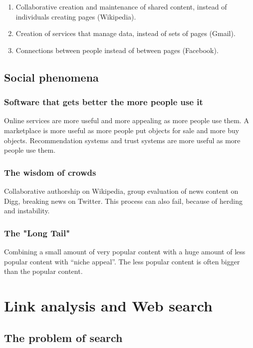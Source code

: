 \begin{enumerate}
\item Collaborative creation and maintenance of shared content, instead of individuals creating pages (Wikipedia).
\item Creation of services that manage data, instead of sets of pages (Gmail).
\item Connections between people instead of between pages (Facebook).
\end{enumerate}

\subsection{Social phenomena}

\subsubsection{Software that gets better the more people use it}

Online services are more useful and more appealing as more people use them. A marketplace is more useful as more people put objects for sale and more buy objects. Recommendation systems and trust systems are more useful as more people use them.

\subsubsection{The wisdom of crowds}

Collaborative authorship on Wikipedia, group evaluation of news content on Digg, breaking news on Twitter. This process can also fail, because of herding and instability.

\subsubsection{The "Long Tail"}

Combining a small amount of very popular content with a huge amount of less popular content with “niche appeal”. The less popular content is often bigger than the popular content.

\section{Link analysis and Web search}

\subsection{The problem of search}

